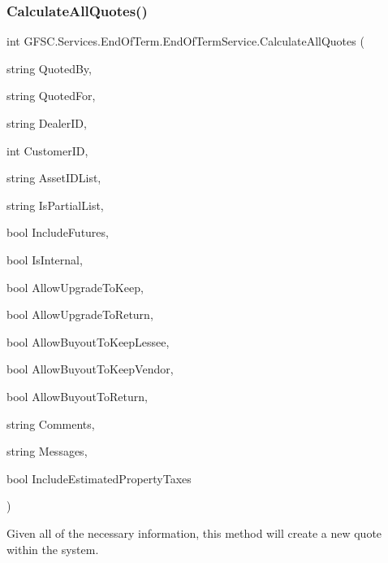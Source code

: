 \subsubsection{\texorpdfstring{Calculate\+All\+Quotes()}{CalculateAllQuotes()}}
{\footnotesize\ttfamily int G\+F\+S\+C.\+Services.\+End\+Of\+Term.\+End\+Of\+Term\+Service.\+Calculate\+All\+Quotes (\begin{DoxyParamCaption}\item[{string}]{Quoted\+By,  }\item[{string}]{Quoted\+For,  }\item[{string}]{Dealer\+ID,  }\item[{int}]{Customer\+ID,  }\item[{string}]{Asset\+I\+D\+List,  }\item[{string}]{Is\+Partial\+List,  }\item[{bool}]{Include\+Futures,  }\item[{bool}]{Is\+Internal,  }\item[{bool}]{Allow\+Upgrade\+To\+Keep,  }\item[{bool}]{Allow\+Upgrade\+To\+Return,  }\item[{bool}]{Allow\+Buyout\+To\+Keep\+Lessee,  }\item[{bool}]{Allow\+Buyout\+To\+Keep\+Vendor,  }\item[{bool}]{Allow\+Buyout\+To\+Return,  }\item[{string}]{Comments,  }\item[{string}]{Messages,  }\item[{bool}]{Include\+Estimated\+Property\+Taxes }\end{DoxyParamCaption})}



Given all of the necessary information, this method will create a new quote within the system. 


